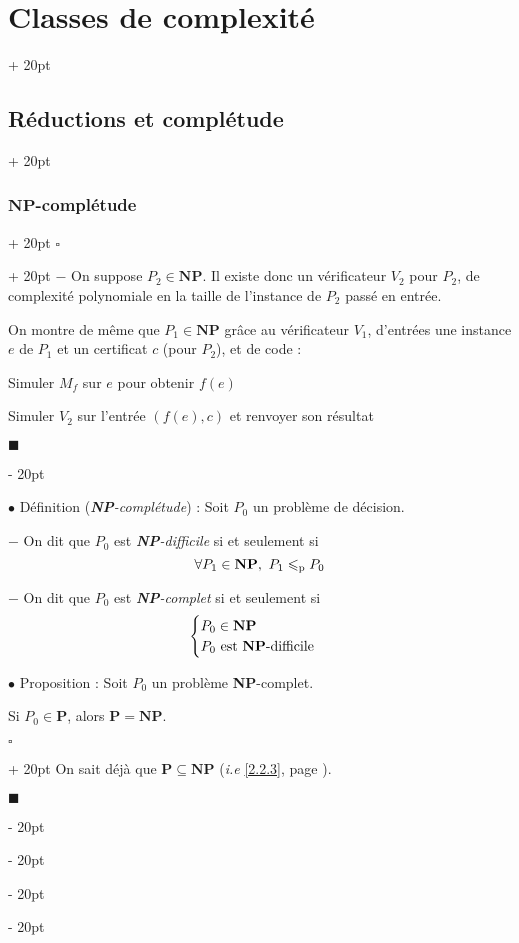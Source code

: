 \documentclass[a4paper, 12pt, twoside]{article}
\newenvironment{indalgo}[2][H]{
    \begin{algoBox}
        \begin{algorithm}[#1]
            \caption{#2}
}
{
        \end{algorithm}
    \end{algoBox}
}
\renewcommand{\le}{\leqslant}
\newcommand{\ind}[1][20pt]{\advance\leftskip + #1}
\newcommand{\deind}[1][20pt]{\advance\leftskip - #1}
\newenvironment{indt}[2][20pt]{#2 \par \ind[#1]}{\par \deind} %
\newenvironment{proof}[1][{}]{\begin{indt}{$\square$ #1}}{$\blacksquare$ \end{indt}}
\begin{document}
\begin{indt}{\section{Classes de complexité}}
\begin{indt}{\subsection{Réductions et complétude}}
\begin{indt}{\subsubsection{$\mathbf{NP}$-complétude}}
\begin{proof}
                    $-$ On suppose $P_2 \in \mathbf{NP}$. Il existe donc un vérificateur $V_2$ pour $P_2$, de complexité polynomiale en la taille de l'instance de $P_2$ passé en entrée.

                    On montre de même que $P_1 \in \mathbf{NP}$ grâce au vérificateur $V_1$, d'entrées une instance $e$ de $P_1$ et un certificat $c$ (pour $P_2$), et de code :
                    \begin{indalgo}{$V_1$}

                        \BlankLine

                        Simuler $M_f$ sur $e$ pour obtenir $f(e)$\;

                        Simuler $V_2$ sur l'entrée $(f(e), c)$ et renvoyer son résultat\;
                    \end{indalgo}
                \end{proof}

                \vspace{12pt}
                
                $\bullet$ Définition (\textit{\textbf{NP}-complétude}) :
                Soit $P_0$ un problème de décision.

                $-$ On dit que $P_0$ est \emph{\textbf{NP}-difficile} si et seulement si
                \[
                    \forall P_1 \in \mathbf{NP},\ P_1 \le_{\rm p} P_0
                \]

                $-$ On dit que $P_0$ est \emph{\textbf{NP}-complet} si et seulement si
                \[
                    \begin{cases}
                        P_0 \in \mathbf{NP}
                        \\
                        P_0\ \text{est \textbf{NP}-difficile}
                    \end{cases}
                \]

                \vspace{12pt}
                
                $\bullet$ Proposition :
                Soit $P_0$ un problème \textbf{NP}-complet.

                Si $P_0 \in \mathbf P$, alors $\mathbf P = \mathbf{NP}$.

                \vspace{6pt}
                
                \begin{proof}
                    On sait déjà que $\mathbf P \subseteq \mathbf{NP}$ (\textit{i.e} \ref{2.2.3}, page \pageref{2.2.3}).


\end{proof}
\end{indt}
\end{indt}
\end{indt}
\end{document}
